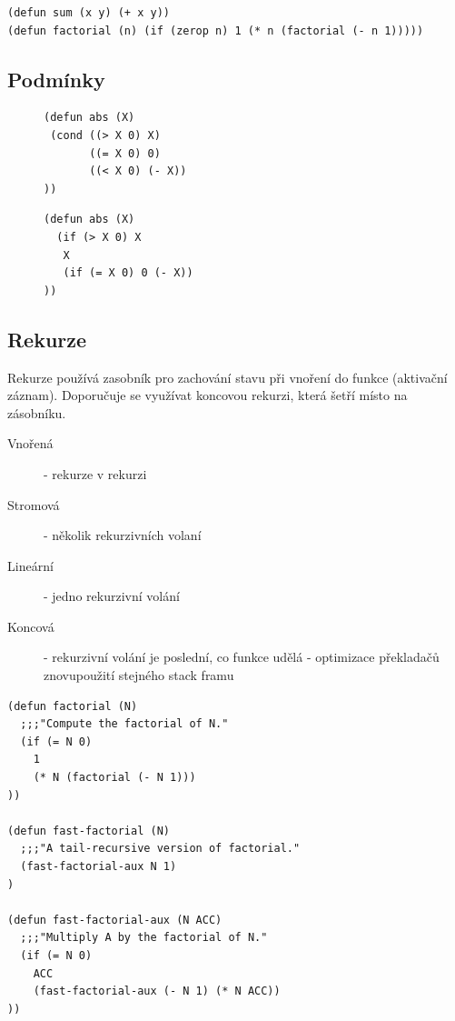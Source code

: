 \documentclass{szzclass}
\begin{document}
\begin{verbatim}
(defun sum (x y) (+ x y))
(defun factorial (n) (if (zerop n) 1 (* n (factorial (- n 1)))))
\end{verbatim}

\subsection{Podmínky}
\begin{figure}[H]
\centering
\begin{minipage}{.5\textwidth}
  \centering
  \begin{verbatim}
(defun abs (X)
 (cond ((> X 0) X) 
       ((= X 0) 0) 
       ((< X 0) (- X)) 
))
  \end{verbatim}
\end{minipage}%
\begin{minipage}{.5\textwidth}
  \begin{verbatim}
(defun abs (X)
  (if (> X 0) X
   X
   (if (= X 0) 0 (- X))
))
  \end{verbatim}
\end{minipage}%
\end{figure}

\subsection{Rekurze}
Rekurze používá zasobník pro zachování stavu při vnoření do funkce (aktivační záznam). Doporučuje se využívat koncovou rekurzi, která šetří místo na zásobníku.

\begin{description}
\item[Vnořená] - rekurze v rekurzi
\item[Stromová] - několik rekurzivních volaní
\item[Lineární] - jedno rekurzivní volání
\item[Koncová] - rekurzivní volání je poslední, co funkce udělá - optimizace překladačů znovupoužití stejného stack framu
\end{description}


\begin{verbatim}
(defun factorial (N)
  ;;;"Compute the factorial of N."
  (if (= N 0)
    1
    (* N (factorial (- N 1)))
))

(defun fast-factorial (N)
  ;;;"A tail-recursive version of factorial."
  (fast-factorial-aux N 1)
)

(defun fast-factorial-aux (N ACC)
  ;;;"Multiply A by the factorial of N."
  (if (= N 0)
    ACC
    (fast-factorial-aux (- N 1) (* N ACC))
))
\end{verbatim}
\end{document}
